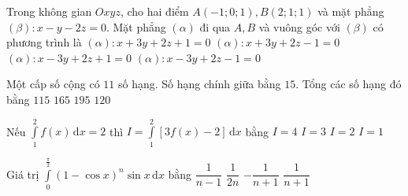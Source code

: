\begin{ex}%
	Trong không gian $Oxyz$, cho hai điểm $A(-1; 0; 1), B(2; 1; 1)$ và mặt phẳng \break $(\beta)\colon x-y-2z=0$. Mặt phẳng $(\alpha)$ đi qua $A, B$ và vuông góc với $(\beta)$ có phương trình là
	\choice
	{$(\alpha)\colon x+3y+2z+1=0$}
	{$(\alpha)\colon x+3y+2z-1=0$}
	{$(\alpha)\colon x-3y+2z+1=0$}
	{\True $(\alpha)\colon x-3y+2z-1=0$}
\end{ex}

\begin{ex}%
	Một cấp số cộng có $11$ số hạng. Số hạng chính giữa bằng $15$. Tổng các số hạng đó bằng
	\choice
	{$115$}
	{\True $165$}
	{$195$}
	{$120$}
\end{ex}

\begin{ex}%
	Nếu $\displaystyle\int\limits_1^2 f(x) \mathrm{\,d}x=2$ thì $I=\displaystyle\int\limits_1^2[3 f(x)-2] \mathrm{\,d}x$ bằng
	\choice
	{\True $I=4$}
	{$I=3$}
	{$I=2$}
	{$I=1$}
\end{ex}
\begin{ex}%
	Giá trị $\displaystyle\int\limits_0^{\frac{\pi}{2}}(1-\cos x)^n \sin x \mathrm{\,d}x$ bằng
	\choice
	{$\dfrac{1}{n-1}$}
	{$\dfrac{1}{2 n}$}
	{$-\dfrac{1}{n+1}$}
	{\True $\dfrac{1}{n+1}$}
\end{ex}

